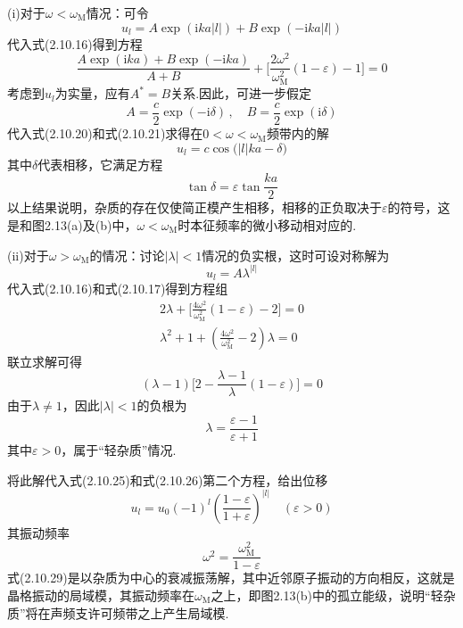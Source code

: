 (i)对于$\omega<\omega_{\mathrm{M}}$情况：可令
\begin{equation}
  u_l=A\exp(\mathrm{i}ka|l|)+B\exp(-\mathrm{i}ka|l|)
\end{equation}
代入式(2.10.16)得到方程
\begin{equation}
  \frac{A\exp(\mathrm{i}ka)+B\exp(-\mathrm{i}ka)}{A+B}
  +\biggl[\frac{2\omega^2}{\omega_{\mathrm{M}}^2}(1-\varepsilon)-1\biggr]=0
\end{equation}
考虑到$u_l$为实量，应有$A^{*}=B$关系.因此，可进一步假定
\begin{equation}
  A=\frac{c}{2}\exp(-\mathrm{i}\delta)\,,\quad
  B=\frac{c}{2}\exp(\mathrm{i}\delta)
\end{equation}
代入式(2.10.20)和式(2.10.21)求得在$0<\omega<\omega_{\mathrm{M}}$频带内的解
\begin{equation}
  u_l=c\cos\bigl(|l|ka-\delta\bigr)
\end{equation}
其中$\delta$代表相移，它满足方程
\begin{equation}
  \tan\delta=\varepsilon\tan\frac{ka}{2}
\end{equation}
以上结果说明，杂质的存在仅使简正模产生相移，相移的正负取决于$\varepsilon$的符号，这是和图2.13(a)及(b)中，$\omega<\omega_{\mathrm{M}}$时本征频率的微小移动相对应的.

(ii)对于$\omega>\omega_{\mathrm{M}}$的情况：讨论$|\lambda|<1$情况的负实根，这时可设对称解为
\begin{equation}
  u_l=A\lambda^{|l|}
\end{equation}
代入式(2.10.16)和式(2.10.17)得到方程组
\begin{equation}
\begin{gathered}
  2\lambda+\biggl[\frac{4\omega^2}{\omega_{\mathrm{M}}^2}(1-\varepsilon)-2\biggr]=0\\[1ex]
  \lambda^2+1+\left(\frac{4\omega^2}{\omega_{\mathrm{M}}^2}-2\right)\lambda=0
\end{gathered}
\end{equation}
联立求解可得
\begin{equation}
  (\lambda-1)\biggl[2-\frac{\lambda-1}{\lambda}(1-\varepsilon)\biggr]=0
\end{equation}
由于$\lambda\neq1$，因此$|\lambda|<1$的负根为
\begin{equation}
  \lambda=\frac{\varepsilon-1}{\varepsilon+1}
\end{equation}
其中$\varepsilon>0$，属于“轻杂质”情况.

将此解代入式(2.10.25)和式(2.10.26)第二个方程，给出位移
\begin{equation}
  u_l=u_0(-1)^l
  \left(\frac{1-\varepsilon}{1+\varepsilon}\right)^{|l|}
  \quad(\varepsilon>0)
\end{equation}
其振动频率
\begin{equation}
  \omega^2=\frac{\omega_{\mathrm{M}}^2}{1-\varepsilon}
\end{equation}
式(2.10.29)是以杂质为中心的衰减振荡解，其中近邻原子振动的方向相反，这就是晶格振动的局域模，其振动频率在$\omega_{\mathrm{M}}$之上，即图2.13(b)中的孤立能级，说明“轻杂质”将在声频支许可频带之上产生局域模.

